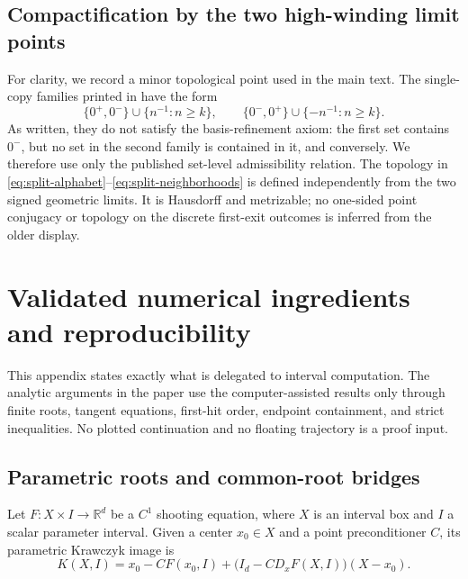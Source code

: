 \documentclass[11pt]{amsart}
\numberwithin{equation}{section}
\theoremstyle{definition}
\theoremstyle{remark}
\newcommand{\R}{\mathbb R}
\begin{document}
\subsection{Compactification by the two high-winding limit points}

For clarity, we record a minor topological point used in the main text.
The single-copy families printed in \cite{Lerman2000DynamicalPhenomena}
have the form
\[
 \{0^+,0^-\}\cup\{n^{-1}:n\ge k\},
 \qquad
 \{0^-,0^+\}\cup\{-n^{-1}:n\ge k\}.
\]
As written, they do not satisfy the basis-refinement axiom: the first set
contains $0^-$, but no set in the second family is contained in it, and
conversely.  We therefore use only the published set-level admissibility
relation.  The topology in
\eqref{eq:split-alphabet}--\eqref{eq:split-neighborhoods} is defined
independently from the two signed geometric limits.  It is Hausdorff and
metrizable; no one-sided point conjugacy or topology on the discrete
first-exit outcomes is inferred from the older display.

\section{Validated numerical ingredients and reproducibility}
\label{app:computer-proof}

This appendix states exactly what is delegated to interval computation.
The analytic arguments in the paper use the computer-assisted results only
through finite roots, tangent equations, first-hit order, endpoint containment,
and strict inequalities.  No plotted continuation and no floating
trajectory is a proof input.

\subsection{Parametric roots and common-root bridges}

Let $F:X\times I\to\R^d$ be a $C^1$ shooting equation, where $X$ is an
interval box and $I$ a scalar parameter interval.  Given a center
$x_0\in X$ and a point preconditioner $C$, its parametric Krawczyk image is
\begin{equation}\label{eq:app-krawczyk}
 K(X,I)=x_0-CF(x_0,I)
 +\bigl(I_d-CD_xF(X,I)\bigr)(X-x_0).
\end{equation}
\end{document}
